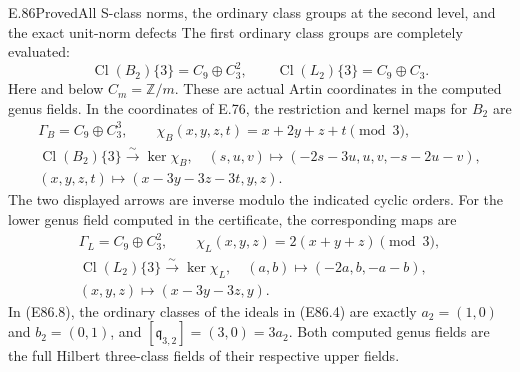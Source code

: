 \begin{statement}{E.86}{Proved}{All S-class norms, the ordinary class groups at the second level, and the exact unit-norm defects}
The first ordinary class groups are completely evaluated:
\[
 \operatorname{Cl}(B_2)\{3\}=C_9\oplus C_3^2,
 \qquad \operatorname{Cl}(L_2)\{3\}=C_9\oplus C_3.
 \tag{E86.6}
\]
Here and below $C_m=\mathbb Z/m$. These are actual Artin
coordinates in the computed genus fields. In the coordinates
of E.76, the restriction and kernel maps for $B_2$ are
\[
 \begin{gathered}
 \Gamma_B=C_9\oplus C_3^3,\qquad
 \chi_B(x,y,z,t)=x+2y+z+t\pmod3,\\
 \operatorname{Cl}(B_2)\{3\}\xrightarrow{\sim}\ker\chi_B,
 \quad(s,u,v)\longmapsto(-2s-3u,u,v,-s-2u-v),\\
 (x,y,z,t)\longmapsto(x-3y-3z-3t,y,z).
 \end{gathered}
 \tag{E86.7}
\]
The two displayed arrows are inverse modulo the indicated
cyclic orders. For the lower genus field computed in the
certificate, the corresponding maps are
\[
 \begin{gathered}
 \Gamma_L=C_9\oplus C_3^2,\qquad
 \chi_L(x,y,z)=2(x+y+z)\pmod3,\\
 \operatorname{Cl}(L_2)\{3\}\xrightarrow{\sim}\ker\chi_L,
 \quad(a,b)\longmapsto(-2a,b,-a-b),\\
 (x,y,z)\longmapsto(x-3y-3z,y).
 \end{gathered}
 \tag{E86.8}
\]
In (E86.8), the ordinary classes of the ideals in (E86.4)
are exactly $a_2=(1,0)$ and $b_2=(0,1)$, and
$[\mathfrak q_{3,2}]=(3,0)=3a_2$.
Both computed genus fields are the full Hilbert three-class
fields of their respective upper fields.


\end{statement}
